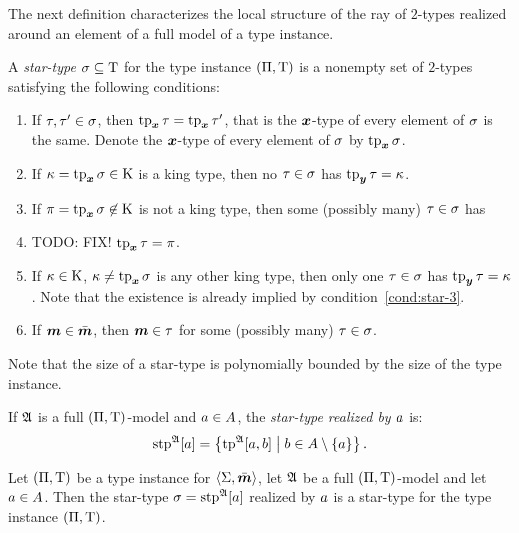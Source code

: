 The next definition characterizes the local structure of the ray of $2$-types
realized around an element of a full model of a type instance.
\begin{definition}
A \emph{star-type} $\sigma \subseteq \mathrm{T}$ for the type instance
$(\Pi,\mathrm{T})$ is a nonempty set of $2$-types satisfying the following conditions:
\begin{enumerate}
  \item\label{cond:star-1} If $\tau, {\tau'} \in \sigma$, then $\operatorname{tp}_{\bm{x}}\tau =
  \operatorname{tp}_{\bm{x}}{\tau'}$, that is the $\bm{x}$-type of every element of $\sigma$ is the same.
  Denote the $\bm{x}$-type of every element of $\sigma$ by $\operatorname{tp}_{\bm{x}}\sigma$.
  \item\label{cond:star-2} If $\kappa = \operatorname{tp}_{\bm{x}}\sigma \in \mathrm{K}$ is a king type, then
  no $\tau \in \sigma$ has $\operatorname{tp}_{\bm{y}}\tau = \kappa$.
  \item\label{cond:star-3} If $\pi = \operatorname{tp}_{\bm{x}}\sigma \not\in \mathrm{K}$ is not a king
  type, then some (possibly many) $\tau \in \sigma$ has
  \item TODO: FIX!
  $\operatorname{tp}_{\bm{x}}\tau = \pi$.
  \item\label{cond:star-4} If $\kappa \in \mathrm{K}$, $\kappa \neq \operatorname{tp}_{\bm{x}}\sigma$ is any
  other king type, then only one $\tau \in \sigma$ has $\operatorname{tp}_{\bm{y}}\tau = \kappa$. Note
  that the existence is already implied by condition~\ref{cond:star-3}.
  \item\label{cond:star-5} If $\bm{m} \in \bar{\bm{m}}$, then $\bm{m} \in \tau$ for some
  (possibly many) $\tau \in \sigma$.
\end{enumerate}
Note that the size of a star-type is polynomially bounded by the size of the
type instance.

If $\mathfrak{A}$ is a full $(\Pi,\mathrm{T})$-model and $a \in A$, the
\emph{star-type realized by $a$} is:
\[
  \operatorname{stp}^{\mathfrak{A}}[a] = \left\{\operatorname{tp}^{\mathfrak{A}}[a,b]\mathrel{}\middle|\mathrel{}b \in A \setminus \left\{a\right\}\right\}.
\]
\end{definition}
\begin{remark}
Let $(\Pi,\mathrm{T})$ be a type instance for $\left\langle \mathrm{\Sigma},\bar{\bm{m}} \right\rangle$, let $\mathfrak{A}$ be
a full $(\Pi,\mathrm{T})$-model and let $a \in A$. Then the star-type
$\sigma = \operatorname{stp}^{\mathfrak{A}}[a]$ realized by $a$ is a star-type for the type instance
$(\Pi,\mathrm{T})$.
\end{remark}
